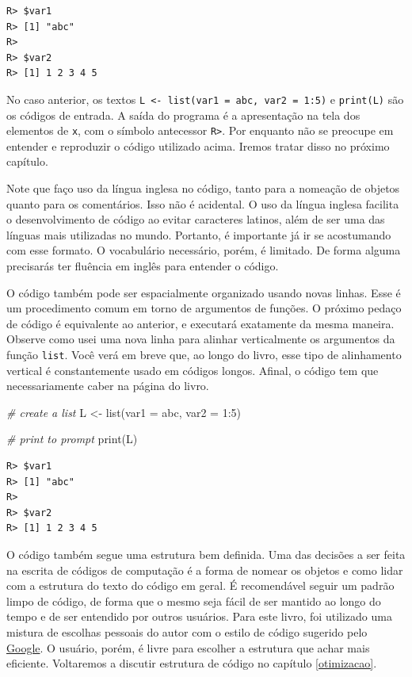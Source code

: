 \documentclass[
  11pt,
]{book}
\newenvironment{Shaded}{\begin{snugshade}}{\end{snugshade}}
\newcommand{\AttributeTok}[1]{\textcolor[rgb]{0.61,0.61,0.61}{#1}}
\newcommand{\CommentTok}[1]{\textcolor[rgb]{0.37,0.37,0.37}{\textit{#1}}}
\newcommand{\DecValTok}[1]{\textcolor[rgb]{0.06,0.06,0.06}{#1}}
\newcommand{\FunctionTok}[1]{\textcolor[rgb]{0,0,0}{#1}}
\newcommand{\NormalTok}[1]{#1}
\newcommand{\OtherTok}[1]{\textcolor[rgb]{0.37,0.37,0.37}{#1}}
\newcommand{\SpecialCharTok}[1]{\textcolor[rgb]{0,0,0}{#1}}
\newcommand{\StringTok}[1]{\textcolor[rgb]{0.5,0.5,0.5}{#1}}
\begin{document}
\begin{verbatim}
R> $var1
R> [1] "abc"
R> 
R> $var2
R> [1] 1 2 3 4 5
\end{verbatim}

No caso anterior, os textos \texttt{L\ \textless{}-\ list(var1\ =\ \textquotesingle{}abc\textquotesingle{},\ var2\ =\ 1:5)} e \texttt{print(L)} são os códigos de entrada. A saída do programa é a apresentação na tela dos elementos de \texttt{x}, com o símbolo antecessor \texttt{R\textgreater{}}. Por enquanto não se preocupe em entender e reproduzir o código utilizado acima. Iremos tratar disso no próximo capítulo.

Note que faço uso da língua inglesa no código, tanto para a nomeação de objetos quanto para os comentários. Isso não é acidental. O uso da língua inglesa facilita o desenvolvimento de código ao evitar caracteres latinos, além de ser uma das línguas mais utilizadas no mundo. Portanto, é importante já ir se acostumando com esse formato. O vocabulário necessário, porém, é limitado. De forma alguma precisarás ter fluência em inglês para entender o código.

O código também pode ser espacialmente organizado usando novas linhas. Esse é um procedimento comum em torno de argumentos de funções. O próximo pedaço de código é equivalente ao anterior, e executará exatamente da mesma maneira. Observe como usei uma nova linha para alinhar verticalmente os argumentos da função \texttt{list}. Você verá em breve que, ao longo do livro, esse tipo de alinhamento vertical é constantemente usado em códigos longos. Afinal, o código tem que necessariamente caber na página do livro.

\begin{Shaded}
\begin{Highlighting}[]
\CommentTok{\# create a list}
\NormalTok{L }\OtherTok{\textless{}{-}} \FunctionTok{list}\NormalTok{(}\AttributeTok{var1 =} \StringTok{\textquotesingle{}abc\textquotesingle{}}\NormalTok{,}
          \AttributeTok{var2 =} \DecValTok{1}\SpecialCharTok{:}\DecValTok{5}\NormalTok{)}

\CommentTok{\# print to prompt}
\FunctionTok{print}\NormalTok{(L)}
\end{Highlighting}
\end{Shaded}

\begin{verbatim}
R> $var1
R> [1] "abc"
R> 
R> $var2
R> [1] 1 2 3 4 5
\end{verbatim}

O código também segue uma estrutura bem definida. Uma das decisões a ser feita na escrita de códigos de computação é a forma de nomear os objetos e como lidar com a estrutura do texto do código em geral. É recomendável seguir um padrão limpo de código, de forma que o mesmo seja fácil de ser mantido ao longo do tempo e de ser entendido por outros usuários. Para este livro, foi utilizado uma mistura de escolhas pessoais do autor com o estilo de código sugerido pelo \href{https://google.github.io/styleguide/Rguide.xml}{Google}. O usuário, porém, é livre para escolher a estrutura que achar mais eficiente. Voltaremos a discutir estrutura de código no capítulo \ref{otimizacao}.
\end{document}
